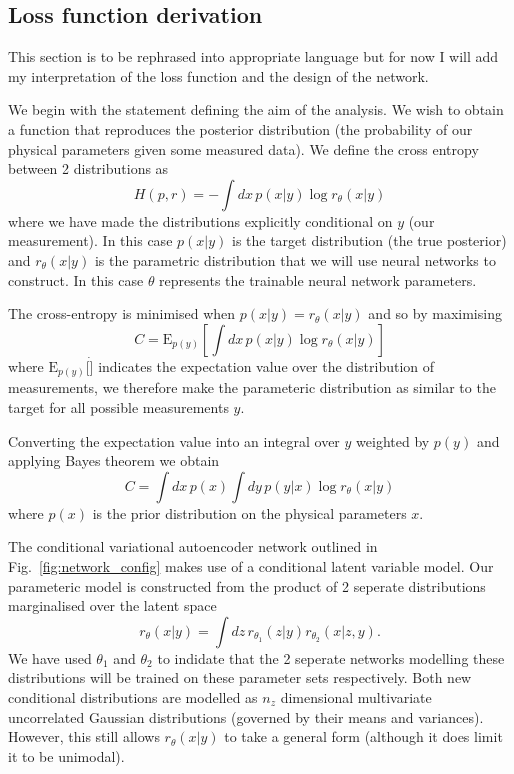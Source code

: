 \documentclass[%
showpacs,
 amsmath,amssymb,
 aps,
 twocolumn,
 prl,
 reprint,
floatfix,
]{revtex4-1}
\begin{document}
\subsection{Loss function derivation} \label{lossDer_sec}

This section is to be rephrased into appropriate language but for now I will
add my interpretation of the loss function and the design of the network.

We begin with the statement defining the aim of the analysis. We wish to obtain
a function that reproduces the posterior distribution (the probability of our
physical parameters given some measured data). We define the cross entropy
between 2 distributions as
%
\begin{equation}\label{eq:cross_ent}
H(p,r) = -\int dx\, p(x|y) \log r_{\theta}(x|y)
\end{equation}
%
where we have made the distributions explicitly conditional on $y$ (our
measurement). In this case $p(x|y)$ is the target distribution (the true
posterior) and $r_{\theta}(x|y)$ is the parametric distribution that we will
use neural networks to construct. In this case $\theta$ represents the
trainable neural network parameters. 

The cross-entropy is minimised when $p(x|y)=r_{\theta}(x|y)$ and so by maximising
%
\begin{equation}\label{eq:cost1}
C = \text{E}_{p(y)}\left[\int dx\,p(x|y) \log r_{\theta}(x|y)\right]
\end{equation}
% 
where $\text{E}_{p(y)}[\dot]$ indicates the expectation value over the
distribution of measurements, we therefore make the parameteric distribution as
similar to the target for all possible measurements $y$.

Converting the expectation value into an integral over $y$ weighted by $p(y)$
and applying Bayes theorem we obtain
%
\begin{equation}\label{eq:cost1}
C = \int dx\,p(x)\int dy\,p(y|x)\log r_{\theta}(x|y)
\end{equation}
%
where $p(x)$ is the prior distribution on the physical parameters $x$.

The conditional variational autoencoder network outlined in
Fig.~\ref{fig:network_config} makes use of a conditional latent variable model.
Our parameteric model is constructed from the product of 2 seperate
distributions marginalised over the latent space
%
\begin{equation}\label{eq:latent_model}
r_{\theta}(x|y) = \int dz\,r_{\theta_{1}}(z|y)r_{\theta_{2}}(x|z,y).
\end{equation}
%  
We have used $\theta_{1}$ and $\theta_{2}$ to indidate that the 2 seperate
networks modelling these distributions will be trained on these parameter sets
respectively. Both new conditional distributions are modelled as $n_{z}$
dimensional multivariate uncorrelated Gaussian distributions (governed by their
means and variances). However, this still allows $r_{\theta}(x|y)$ to take a
general form (although it does limit it to be unimodal).  
\end{document}
